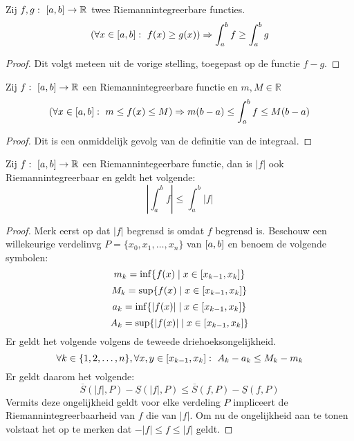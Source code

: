 \documentclass[main.tex]{subfiles}
\begin{document}
\begin{bpr}
  \label{pr:integraal-behoudt-orde-2}
  Zij $f,g:\ \interval{a}{b} \rightarrow \mathbb{R}$ twee Riemannintegreerbare functies.
  \[ \left( \forall x\in \interval{a}{b}:\ f(x) \ge g(x) \right) \Rightarrow \int_{a}^{b} f \ge \int_{a}^{b}g \]

  \begin{proof}
    Dit volgt meteen uit de vorige stelling, toegepast op de functie $f-g$.
  \end{proof}
\end{bpr}

\begin{bpr}
  Zij $f:\ \interval{a}{b} \rightarrow \mathbb{R}$ een Riemannintegreerbare functie en $m,M \in \mathbb{R}$
  \[ \left( \forall x\in \interval{a}{b}:\ m \le f(x) \le M \right) \Rightarrow m(b-a) \le \int_{a}^{b}f \le M(b-a) \]

  \begin{proof}
    Dit is een onmiddelijk gevolg van de definitie van de integraal.
  \end{proof}
\end{bpr}

\begin{bpr}
  \label{pr:absolute-waarde-bijna-door-integraal}
  Zij $f:\ \interval{a}{b} \rightarrow \mathbb{R}$ een Riemannintegeerbare functie, dan is $|f|$ ook Riemannintegreerbaar en geldt het volgende:
  \[ \left| \int_{a}^{b}f \right| \le \int_{a}^{b}|f| \]

  \begin{proof}
    Merk eerst op dat $|f|$ begrensd is omdat $f$ begrensd is.
    Beschouw een willekeurige verdelinvg $P = \{x_{0},x_{1},\dotsc,x_{n}\}$ van $\interval{a}{b}$ en benoem de volgende symbolen:
    \[ m_{k} = \inf\{ f(x) \mid x\in \interval{x_{k-1}}{x_{k}} \} \]
    \[ M_{k} = \sup\{ f(x) \mid x\in \interval{x_{k-1}}{x_{k}} \} \]
    \[ a_{k} = \inf\{ |f(x)| \mid x\in \interval{x_{k-1}}{x_{k}} \} \]
    \[ A_{k} = \sup\{ |f(x)| \mid x\in \interval{x_{k-1}}{x_{k}} \} \]
    Er geldt het volgende volgens de teweede driehoeksongelijkheid.
    \[ \forall k\in\{1,2,\dotsc,n\}, \forall x,y\in\interval{x_{k-1}}{x_{k}}:\ A_{k}-a_{k} \le M_{k}-m_{k} \]
    Er geldt daarom het volgende:
    \[ \overline{S}(|f|,P) - \underline{S}(|f|,P) \le \overline{S}(f,P) - \underline{S}(f,P) \]
    Vermits deze ongelijkheid geldt voor elke verdeling $P$ impliceert de Riemannintegreerbaarheid van $f$ die van $|f|$.
    Om nu de ongelijkheid aan te tonen volstaat het op te merken dat $-|f| \le f \le |f|$ geldt.
  \end{proof}
\end{bpr}
\end{document}
